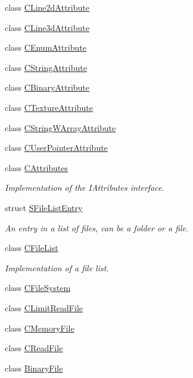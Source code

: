 \begin{DoxyCompactItemize}
class \hyperlink{classirr_1_1io_1_1_c_line2d_attribute}{C\-Line2d\-Attribute}
\item 
class \hyperlink{classirr_1_1io_1_1_c_line3d_attribute}{C\-Line3d\-Attribute}
\item 
class \hyperlink{classirr_1_1io_1_1_c_enum_attribute}{C\-Enum\-Attribute}
\item 
class \hyperlink{classirr_1_1io_1_1_c_string_attribute}{C\-String\-Attribute}
\item 
class \hyperlink{classirr_1_1io_1_1_c_binary_attribute}{C\-Binary\-Attribute}
\item 
class \hyperlink{classirr_1_1io_1_1_c_texture_attribute}{C\-Texture\-Attribute}
\item 
class \hyperlink{classirr_1_1io_1_1_c_string_w_array_attribute}{C\-String\-W\-Array\-Attribute}
\item 
class \hyperlink{classirr_1_1io_1_1_c_user_pointer_attribute}{C\-User\-Pointer\-Attribute}
\item 
class \hyperlink{classirr_1_1io_1_1_c_attributes}{C\-Attributes}
\begin{DoxyCompactList}\small\item\em Implementation of the I\-Attributes interface. \end{DoxyCompactList}\item 
struct \hyperlink{structirr_1_1io_1_1_s_file_list_entry}{S\-File\-List\-Entry}
\begin{DoxyCompactList}\small\item\em An entry in a list of files, can be a folder or a file. \end{DoxyCompactList}\item 
class \hyperlink{classirr_1_1io_1_1_c_file_list}{C\-File\-List}
\begin{DoxyCompactList}\small\item\em Implementation of a file list. \end{DoxyCompactList}\item 
class \hyperlink{classirr_1_1io_1_1_c_file_system}{C\-File\-System}
\item 
class \hyperlink{classirr_1_1io_1_1_c_limit_read_file}{C\-Limit\-Read\-File}
\item 
class \hyperlink{classirr_1_1io_1_1_c_memory_file}{C\-Memory\-File}
\item 
class \hyperlink{classirr_1_1io_1_1_c_read_file}{C\-Read\-File}
\item 
class \hyperlink{classirr_1_1io_1_1_binary_file}{Binary\-File}
\item 

\end{DoxyCompactItemize}
